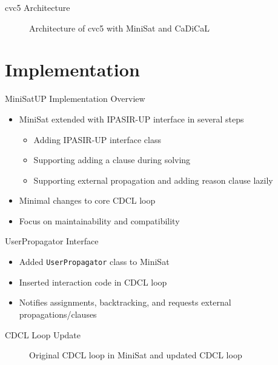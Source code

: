 \documentclass{beamer}
\newcommand*{\code}[1]{\lstinline[basicstyle=\ttfamily, breaklines]|#1|}
\begin{document}
\begin{frame}{cvc5 Architecture}
  \begin{figure}
    \centering
    
    \caption{Architecture of cvc5 with MiniSat and CaDiCaL}
  \end{figure}
\end{frame}

\section{Implementation}

\begin{frame}{MiniSatUP Implementation Overview}
  \begin{itemize}
    \item MiniSat extended with IPASIR-UP interface in several steps
      \begin{itemize}
        \item Adding IPASIR-UP interface class
        \item Supporting adding a clause during solving
        \item Supporting external propagation and adding reason clause lazily
      \end{itemize}
    \item Minimal changes to core CDCL loop
    \item Focus on maintainability and compatibility
  \end{itemize}
\end{frame}

\begin{frame}{UserPropagator Interface}
  \begin{itemize}
    \item Added \code{UserPropagator} class to MiniSat
    \item Inserted interaction code in CDCL loop
    \item Notifies assignments, backtracking, and requests external propagations/clauses
  \end{itemize}
\end{frame}

\begin{frame}{CDCL Loop Update}
  \begin{figure}
    \centering
    
    \caption{Original CDCL loop in MiniSat and updated CDCL loop}
  \end{figure}
\end{frame}
\end{document}
